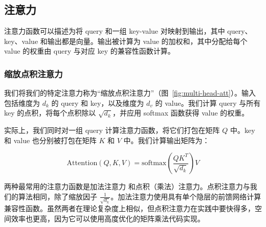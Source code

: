 
\subsection{注意力} \label{sec:attention}
注意力函数可以描述为将 query 和一组 key-value 对映射到输出，其中 query、key、value 和输出都是向量。输出被计算为 value 的加权和，其中分配给每个 value 的权重由 query 与对应 key 的兼容性函数计算。

\subsubsection{缩放点积注意力} \label{sec:scaled-dot-prod}


我们将我们的特定注意力称为``缩放点积注意力''（图~\ref{fig:multi-head-att}）。输入包括维度为 $d_k$ 的 query 和 key，以及维度为 $d_v$ 的 value。我们计算 query 与所有 key 的点积，将每个点积除以 $\sqrt{d_k}$，并应用 softmax 函数获得 value 的权重。

实际上，我们同时对一组 query 计算注意力函数，将它们打包在矩阵 $Q$ 中。key 和 value 也分别被打包在矩阵 $K$ 和 $V$ 中。我们计算输出矩阵为：

\begin{equation}
   \mathrm{Attention}(Q, K, V) = \mathrm{softmax}(\frac{QK^T}{\sqrt{d_k}})V
\end{equation}

两种最常用的注意力函数是加法注意力 \citep{bahdanau2014neural} 和点积（乘法）注意力。点积注意力与我们的算法相同，除了缩放因子 $\frac{1}{\sqrt{d_k}}$。加法注意力使用具有单个隐层的前馈网络计算兼容性函数。虽然两者在理论复杂度上相似，但点积注意力在实践中要快得多，空间效率也更高，因为它可以使用高度优化的矩阵乘法代码实现。 

